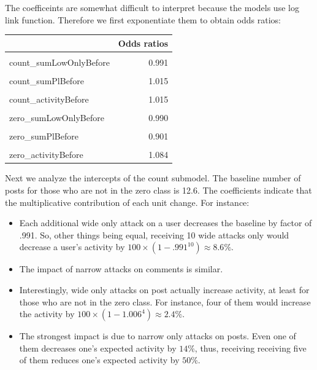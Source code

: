 \documentclass[10pt,]{scrartcl}
\begin{document}
The coefficeints are somewhat difficult to interpret because the models
use log link function. Therefore we first exponentiate them to obtain
odds ratios:

\begin{table}
\centering\begingroup\fontsize{9}{11}\selectfont

\begin{tabular}{lr}
\toprule
  & Odds ratios\\
\midrule
\cellcolor{gray!6}{count\_(Intercept)} & \cellcolor{gray!6}{12.606}\\
count\_sumLowOnlyBefore & 0.991\\
\cellcolor{gray!6}{count\_sumHighBefore} & \cellcolor{gray!6}{0.992}\\
count\_sumPlBefore & 1.015\\
\cellcolor{gray!6}{count\_sumPhBefore} & \cellcolor{gray!6}{0.870}\\
\addlinespace
count\_activityBefore & 1.015\\
\cellcolor{gray!6}{zero\_(Intercept)} & \cellcolor{gray!6}{1.634}\\
zero\_sumLowOnlyBefore & 0.990\\
\cellcolor{gray!6}{zero\_sumHighBefore} & \cellcolor{gray!6}{0.894}\\
zero\_sumPlBefore & 0.901\\
\addlinespace
\cellcolor{gray!6}{zero\_sumPhBefore} & \cellcolor{gray!6}{1.156}\\
zero\_activityBefore & 1.084\\
\bottomrule
\end{tabular}
\endgroup{}
\end{table}

Next we analyze the intercepts of the count submodel. The baseline
number of posts for those who are not in the zero class is 12.6. The
coefficients indicate that the multiplicative contribution of each unit
change. For instance:

\begin{itemize}
\item Each additional wide only attack on a user decreases the baseline by factor of .991. So, other things being equal, receiving 10 wide attacks only would decrease  a user's activity by $100 \times (1-.991^{10}) \approx 8.6\%$.
\item The impact of narrow attacks on comments is similar.
\item Interestingly, wide only attacks on post actually increase activity, at least for those who are not in the zero class. For instance, four of them would increase the activity by $100\times (1-1.006^4) \approx 2.4\%$.
\item The strongest impact is due to narrow only attacks on posts. Even one of them decreases one's expected activity by $14\%$, thus, receiving  receiving five of them  reduces one's expected activity by $50\%$. 
\end{itemize}
\end{document}
